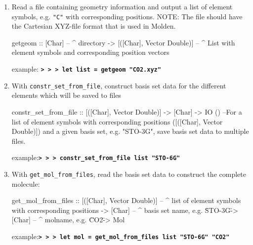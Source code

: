 \documentclass[twoside,        %
			   11pt,			%
               BCOR10mm,       %
               ngerman,english  %
               ]{scrartcl}
\begin{document}
\begin{enumerate}
\item Read a file containing geometry information and output a list of element symbols, e.g. \texttt{"C"} with corresponding positions.
NOTE: The file should have the Cartesian XYZ-file format that is used in Molden.
\begin{code}
getgeom :: [Char] -- ^ directory
	-> [([Char], Vector Double)] -- ^ List with element symbols and corresponding position vectors
\end{code}
example:
\textbf{\texttt{> > > let list = getgeom "CO2.xyz"}}
\item With \texttt{constr\_set\_from\_file}, construct basis set data for the different elements which will be saved to files
\begin{code}
constr_set_from_file :: [([Char], Vector Double)] -> [Char] -> IO ()
--For a list of element symbols with corresponding positions ([([Char], Vector Double)]) and a given basis set, e.g. "STO-3G", save basis set data to multiple files.
\end{code}
example:\textbf{\texttt{> > > constr\_set\_from\_file list "STO-6G"}}
\item With \texttt{get\_mol\_from\_files}, read the basis set data to construct the complete molecule:
\begin{code}
get_mol_from_files :: [([Char], Vector Double)] -- ^ list of element symbols with corresponding positions
		-> [Char] -- ^ basis set name, e.g. \"STO-3G\"
		-> [Char] -- ^ molname, e.g. \"CO2\"
		-> Mol
\end{code}
example:\textbf{\texttt{> > > let mol = get\_mol\_from\_files list "STO-6G" "CO2"}}
\end{enumerate}
\end{document}
